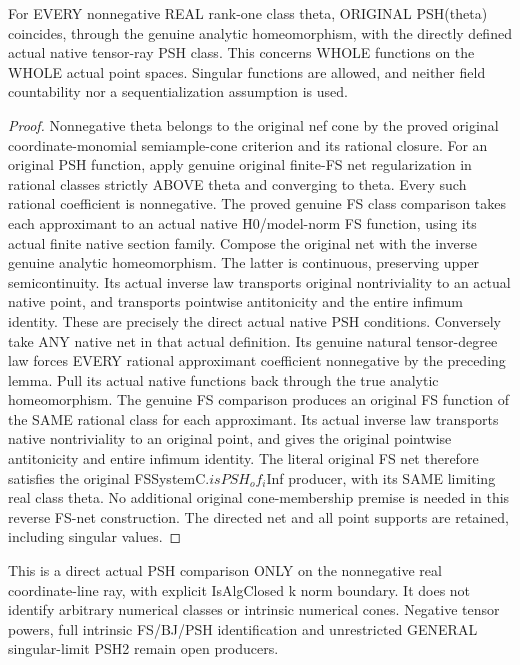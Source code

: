 \begin{theorem}
\label{thm:seven-native-tensor-ray-psh-class-comparison}
\leanok
For EVERY nonnegative REAL rank-one class theta, ORIGINAL PSH(theta)
coincides, through the genuine analytic homeomorphism, with the directly
defined actual native tensor-ray PSH class. This concerns WHOLE functions
on the WHOLE actual point spaces. Singular functions are allowed, and
neither field countability nor a sequentialization assumption is used.
\end{theorem}
\begin{proof}
Nonnegative theta belongs to the original nef cone by the proved original
coordinate-monomial semiample-cone criterion and its rational closure.
For an original PSH function, apply genuine original finite-FS net
regularization in rational classes strictly ABOVE theta and converging
to theta. Every such rational coefficient is nonnegative. The proved
genuine FS class comparison takes each approximant to an actual native
H0/model-norm FS function, using its actual finite native section family.
Compose the original net with the inverse genuine analytic homeomorphism.
The latter is continuous, preserving upper semicontinuity. Its actual
inverse law transports original nontriviality to an actual native point,
and transports pointwise antitonicity and the entire infimum identity.
These are precisely the direct actual native PSH conditions.
Conversely take ANY native net in that actual definition. Its genuine
natural tensor-degree law forces EVERY rational approximant coefficient
nonnegative by the preceding lemma. Pull its actual native functions
back through the true analytic homeomorphism. The genuine FS comparison
produces an original FS function of the SAME rational class for each
approximant. Its actual inverse law transports native nontriviality to
an original point, and gives the original pointwise antitonicity and
entire infimum identity. The literal original FS net therefore satisfies
the original FSSystemC.$isPSH_o$$f_i$Inf producer, with its SAME limiting
real class theta. No additional original cone-membership premise is
needed in this reverse FS-net construction. The directed net and all
point supports are retained, including singular values.
\end{proof}

This is a direct actual PSH comparison ONLY on the nonnegative real
coordinate-line ray, with explicit IsAlgClosed k norm boundary. It does
not identify arbitrary numerical classes or intrinsic numerical cones.
Negative tensor powers, full intrinsic FS/BJ/PSH identification and
unrestricted GENERAL singular-limit PSH2 remain open producers.

